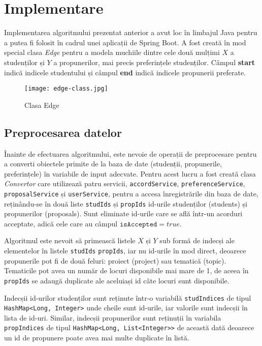 \section{Implementare}

Implementarea algoritmului prezentat anterior a avut loc în limbajul Java pentru a putea fi folosit în cadrul unei aplicații de Spring Boot. A fost creată în mod special clasa \textit{Edge} pentru a modela muchiile dintre cele două mulțimi $X$ a studenților și $Y$ a propunerilor, mai precis preferințele studenților. Câmpul \textbf{start} indică indicele studentului și câmpul \textbf{end} indică indicele propunerii preferate.

\begin{figure}[H]
	\centering
	\texttt{[image: edge-class.jpg]}
	\caption{Clasa Edge}
\end{figure}

\subsection{Preprocesarea datelor}

Înainte de efectuarea algoritmului, este nevoie de operații de preprocesare pentru a converti obiectele primite de la baza de date (studenții, propunerile, preferințele) în variabile de input adecvate. Pentru acest lucru a fost creată clasa \textit{Convertor} care utilizează patru servicii, \texttt{accordService}, \texttt{preferenceService}, \texttt{proposalService} și \texttt{userService}, pentru a accesa înregistrările din baza de date, reținându-se în două liste \texttt{studIds} și \texttt{propIds} id-urile studenților (students) și propunerilor (proposals). Sunt eliminate id-urile care se află într-un acorduri acceptate, adică cele care au câmpul $\texttt{isAccepted} = true$.

Algoritmul este nevoit să primească listele $X$ și $Y$ sub formă de indecși ale elementelor în listele \texttt{studIds} \texttt{propIds}, iar nu id-urile în mod direct, deoarece propunerile pot fi de două feluri: proiect (project) sau tematică (topic). Tematicile pot avea un număr de locuri disponibile mai mare de 1, de aceea în \texttt{propIds} se adaugă duplicate ale aceluiași id câte locuri sunt disponibile.

Indecșii id-urilor studenților sunt reținute într-o variabilă \texttt{studIndices} de tipul \texttt{HashMap<Long, Integer>} unde cheile sunt id-urile, iar valorile sunt indecșii în lista de id-uri. Similar, indecșii propunerilor sunt reținuții în variabila \texttt{propIndices} de tipul \texttt{HashMap<Long, List<Integer>>} de această dată deoarece un id de propunere poate avea mai multe duplicate în listă.

